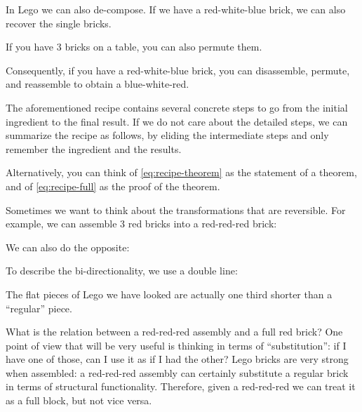 
In Lego we can also de-compose.
If we have a red-white-blue brick, we can also recover the single bricks.


If you have 3 bricks on a table, you can also permute them.


Consequently, if you have a red-white-blue brick, you can disassemble, permute, and reassemble to obtain a blue-white-red.


The aforementioned recipe contains several concrete steps to go from the initial ingredient to the final result.
If we do not care about the detailed steps, we can summarize the recipe as follows, by eliding the intermediate steps and only remember the ingredient and the results.


Alternatively, you can think of \cref{eq:recipe-theorem} as the statement of a theorem, and of \cref{eq:recipe-full} as the proof of the theorem.

Sometimes we want to think about the transformations that are reversible.
For example, we can assemble 3 red bricks into a red-red-red brick:


We can also do the opposite:


To describe the bi-directionality, we use a double line:


The flat pieces of Lego we have looked are actually one third shorter than a ``regular'' piece.


What is the relation between a red-red-red assembly and a full red brick?
One point of view that will be very useful is thinking in terms of ``substitution'': if I have one of those, can I use it as if I had the other?
Lego bricks are very strong when assembled: a red-red-red assembly can certainly substitute a regular brick in terms of structural functionality.
Therefore, given a red-red-red we can treat it as a full block, but not vice versa.

